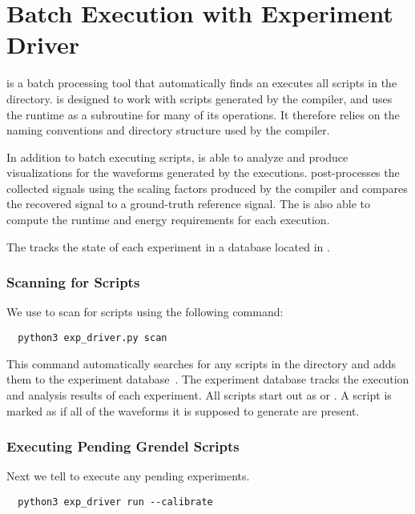 \chapter{Batch Execution with Experiment Driver}

\expdriver is a batch processing tool that automatically finds an executes all \grendel scripts in
the  directory. \expdriver is designed to work with \grendel
scripts generated by the \legno compiler, and uses the \grendel runtime as a
subroutine for many of its operations. It therefore relies on the naming
conventions and directory structure used by the \legno compiler.

In addition to batch executing scripts, \expdriver is able to analyze and
produce visualizations for the waveforms generated by the executions. \expdriver
post-processes the collected signals using the scaling factors produced by the
\legno compiler and compares the recovered signal to a ground-truth reference
signal. The \expdriver is also able to compute the runtime and energy
requirements for each execution.

The \expdriver tracks the state of each experiment in a database located in
.

\subsection{Scanning for \grendel Scripts}

We use \expdriver to scan for \grendel scripts using the following command:

\begin{lstlisting}
  python3 exp_driver.py scan
\end{lstlisting}

This command automatically searches for any \grendel scripts in the 
directory and adds them to the experiment database~\cite{experiment.db}. The
experiment database tracks the execution and analysis results of each
experiment. All scripts start out as  or . A script is
marked as  if all of the waveforms it is supposed to generate are present.


\subsection{Executing Pending Grendel Scripts}
Next we tell \expdriver to execute any pending experiments.

\begin{lstlisting}
  python3 exp_driver run --calibrate
\end{lstlisting}

